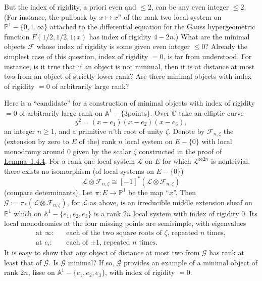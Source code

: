But the index of rigidity, a priori even and \(\leq 2\), can be any even
integer \(\leq 2\). (For instance, the pullback by \(x\mapsto x^n\) of the rank
two local system on \(\mathbb{P}^1-\{0,1,\infty\}\) attached to the
differential equation for the Gauss hypergeometric function
\(F(1/2,1/2,1;x)\) has index of rigidity \(4-2n\).) What are the minimal
objects \(\mathcal{F}\) whose index of rigidity is some given even integer
\(\leq 0\)? Already the simplest case of this question, index of rigidity
\(=0\), is far from understood. For instance, is it true that if an object is
not minimal, then it is at distance at most two from an object of strictly
lower rank? Are there minimal objects with index of rigidity \(=0\) of
arbitrarily large rank?

Here is a ``candidate'' for a construction of minimal objects with index of
rigidity \(=0\) of arbitrarily large rank on \(\mathbb{A}^1-\{3\text{
points}\}\). Over \(\mathbb{C}\) take an elliptic curve
\[
  y^2=(x-e_1)(x-e_2)(x-e_3),
\]
an integer \(n\geq 1\), and a primitive \(n\)'th root of unity \(\zeta\).
Denote by \(\mathcal{F}_{n,\zeta}\) the (extension by zero to \(E\) of the)
rank \(n\) local system on \(E-\{0\}\) with local monodromy around \(0\) given
by the scalar \(\zeta\) constructed in the proof of
\hyperref[lem:1.4.4]{Lemma~1.4.4}. For a rank one local system \(\mathcal{L}\)
on \(E\) for which \(\mathcal{L}^{\otimes 2n}\) is nontrivial, there exists no
isomorphism (of local systems on \(E-\{0\}\))
\[
  \mathcal{L}\otimes\mathcal{F}_{n,\zeta}
  \cong[-1]^*(\mathcal{L}\otimes\mathcal{F}_{n,\zeta})
\]
(compare determinants). Let \(\pi:E\to\mathbb{P}^1\) be the map ``\(x\)''.
Then \(\mathcal{G}:=\pi_*(\mathcal{L}\otimes\mathcal{F}_{n,\zeta})\), for
\(\mathcal{L}\) as above, is an irreducible middle extension sheaf on
\(\mathbb{P}^1\) which on \(\mathbb{A}^1-\{e_1,e_2,e_3\}\) is a rank \(2n\)
local system with index of rigidity \(0\). Its local monodromies at the four
missing points are semisimple, with eigenvalues
\[
\begin{aligned}
  \text{at \(\infty\):}\quad
    &\text{each of the two square roots of \(\zeta\), repeated \(n\) times},\\
  \text{at \(e_i\):}\quad
    &\text{each of \(\pm 1\), repeated \(n\) times}.
\end{aligned}
\]
It is easy to show that any object of distance at most two from
\(\mathcal{G}\) has rank at least that of \(\mathcal{G}\). Is \(\mathcal{G}\)
minimal? If so, \(\mathcal{G}\) provides an example of a minimal object of rank
\(2n\), lisse on \(\mathbb{A}^1-\{e_1,e_2,e_3\}\), with index of rigidity
\(=0\).

